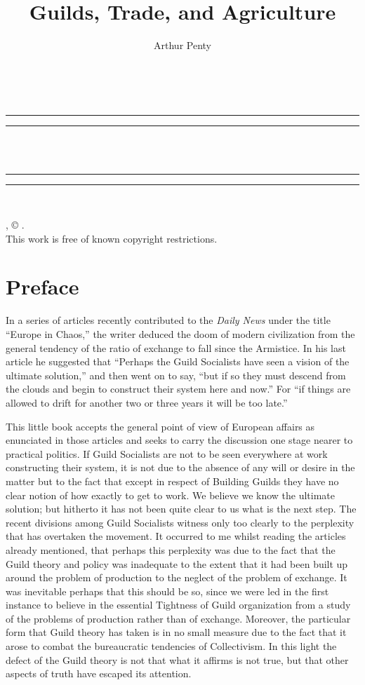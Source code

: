 \documentclass{book}
\date{}
\title{Guilds, Trade, and Agriculture}
\author{Arthur Penty}
\makeatletter
\renewcommand{\maketitle}{
  \thispagestyle{empty}
  \vspace*{\stretch{1}}
  
  \begin{center}
    {\Huge \@title   \\[5mm]}
  \end{center}
  \vspace*{\stretch{2}}
  
  \newpage
  \thispagestyle{empty}
  \cleardoublepage

  \begin{center}  
    \thispagestyle{empty}
    \vspace*{\baselineskip}
    \rule{\textwidth}{1.6pt}\vspace*{-\baselineskip}\vspace*{2pt}
    \rule{\textwidth}{0.4pt}\\[\baselineskip]
    
    {\Huge\scshape \@title   \\[5mm]}
    {\Large }
    
    \rule{\textwidth}{0.4pt}\vspace*{-\baselineskip}\vspace{3.2pt}
    \rule{\textwidth}{1.6pt}\\[\baselineskip]

    \vspace*{4\baselineskip}

    {\Large \@author}
    \vfill
    
  \end{center}
  
  \pagebreak
  \newpage
  \thispagestyle{empty}
  \null\vfill
  \noindent
  \begin{center}
    {\emph{\@title}, © \@author.\\[5mm]}
    {This work is free of known copyright restrictions.\\[5mm]}
  \end{center}
  \pagebreak
  \newpage
}
\makeatother
\begin{document}



\maketitle

\setcounter{tocdepth}{0}
\setcounter{secnumdepth}{0}
\tableofcontents
\chapter*{Preface}
\label{chapter-0}
In a series of articles recently contributed to the \emph{Daily News} under the title “Europe in Chaos,” the writer deduced the doom of modern civilization from the general tendency of the ratio of exchange to fall since the Armistice. In his last article he suggested that “Perhaps the Guild Socialists have seen a vision of the ultimate solution,” and then went on to say, “but if so they must descend from the clouds and begin to construct their system here and now.” For “if things are allowed to drift for another two or three years it will be too late.”

This little book accepts the general point of view of European affairs as enunciated in those articles and seeks to carry the discussion one stage nearer to practical politics. If Guild Socialists are not to be seen everywhere at work constructing their system, it is not due to the absence of any will or desire in the matter but to the fact that except in respect of Building Guilds they have no clear notion of how exactly to get to work. We believe we know the ultimate solution; but hitherto it has not been quite clear to us what is the next step. The recent divisions among Guild Socialists witness only too clearly to the perplexity that has overtaken the movement. It occurred to me whilst reading the articles already mentioned, that perhaps this perplexity was due to the fact that the Guild theory and policy was inadequate to the extent that it had been built up around the problem of production to the neglect of the problem of exchange. It was inevitable perhaps that this should be so, since we were led in the first instance to believe in the essential Tightness of Guild organization from a study of the problems of production rather than of exchange. Moreover, the particular form that Guild theory has taken is in no small measure due to the fact that it arose to combat the bureaucratic tendencies of Collectivism. In this light the defect of the Guild theory is not that what it affirms is not true, but that other aspects of truth have escaped its attention.
\end{document}

